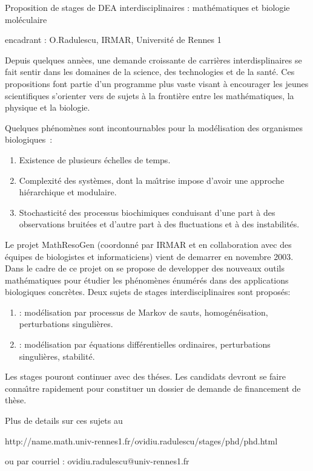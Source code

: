 \documentclass[12pt,a4paper]{article}
\date{}
\begin{document}
{\large Proposition de stages de DEA interdisciplinaires : math{\'e}matiques et biologie mol{\'e}culaire }

encadrant : O.Radulescu, IRMAR, Universit\'e de Rennes 1

Depuis quelques ann{\`e}es, une demande croissante de carri{\`e}res 
interdisplinaires se fait sentir dans les
domaines de la science, des
technologies et de la sant{\'e}. Ces propositions font partie d'un programme plus vaste 
visant {\`a} encourager les jeunes scientifiques s'orienter vers de sujets
{\`a} la fronti{\`e}re entre les math{\'e}matiques, la physique et la biologie.


Quelques ph{\'e}nom{\`e}nes
sont incontournables pour la mod{\'e}lisation des organismes biologiques~: 

\begin{enumerate}
\item 
Existence de plusieurs {\'e}chelles de temps.    
\item
Complexit{\'e} des syst{\`e}mes, dont la ma{\^\i}trise impose d'avoir une approche
hi{\'e}rarchique et modulaire.
\item
Stochasticit{\'e} des processus biochimiques conduisant d'une part {\`a} des observations
bruit{\'e}es et d'autre part {\`a} des fluctuations et {\`a} des instabilit{\'e}s.
\end{enumerate}

Le projet MathResoGen (coordonn{\'e} par IRMAR et en collaboration 
avec des {\'e}quipes de biologistes et informaticiens) 
vient de demarrer en novembre 2003. Dans le cadre de ce projet
on se propose de developper 
des nouveaux outils math{\'e}matiques 
pour {\'e}tudier les
ph{\'e}nom{\`e}nes {\'e}num{\'e}r{\'e}s dans des applications 
biologiques concr{\`e}tes.
Deux sujets de stages interdisciplinaires sont propos{\'e}s:

\begin{enumerate}
\item
{} : mod{\'e}lisation par processus 
de Markov de sauts, homog{\'e}n{\'e}isation, perturbations singuli{\`e}res.
\item
{} : mod{\'e}lisation par {\'e}quations diff{\'e}rentielles ordinaires,
perturbations singuli{\`e}res, stabilit{\'e}.
\end{enumerate}

Les stages  pouront continuer avec des th{\'e}ses. Les candidats devront se faire
conna{\^\i}tre rapidement pour constituer un dossier 
de demande de financement de th{\`e}se.  

Plus de details sur ces sujets  au 

http://name.math.univ-rennes1.fr/ovidiu.radulescu/stages/phd/phd.html

ou par courriel : ovidiu.radulescu@univ-rennes1.fr
\end{document}
